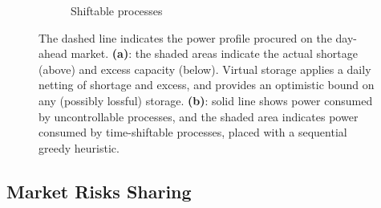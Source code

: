 \documentclass[conference]{IEEEtran}
\begin{document}
\begin{figure}[t!]
\begin{subfigure}[b]{0.45\columnwidth}
        \caption{Shiftable processes}
        \label{fig:movable}
    \end{subfigure}
\caption{The dashed line indicates the power profile procured on the day-ahead market. \textbf{(a)}: the shaded areas indicate the actual shortage (above) and excess capacity (below). Virtual storage applies a daily netting of shortage and excess, and provides an optimistic bound on any (possibly lossful) storage. \textbf{(b)}: solid line shows power consumed by uncontrollable processes, and the shaded area indicates power consumed by time-shiftable processes, placed with a sequential greedy heuristic.}
\label{fig:shortage}
\end{figure}




\subsection{Market Risks Sharing}
\end{document}
